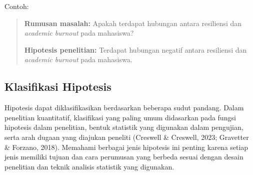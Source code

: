 \documentclass[
  indonesian,
  letterpaper,
  DIV=11,
  numbers=noendperiod]{scrreprt}
\begin{document}
Contoh:

\begin{quote}
\textbf{Rumusan masalah:} Apakah terdapat hubungan antara resiliensi dan
\emph{academic burnout} pada mahasiswa?

\textbf{Hipotesis penelitian:} Terdapat hubungan negatif antara
resiliensi dan \emph{academic burnout} pada mahasiswa.
\end{quote}

\subsection{Klasifikasi Hipotesis}\label{klasifikasi-hipotesis}

Hipotesis dapat diklasifikasikan berdasarkan beberapa sudut pandang.
Dalam penelitian kuantitatif, klasifikasi yang paling umum didasarkan
pada fungsi hipotesis dalam penelitian, bentuk statistik yang digunakan
dalam pengujian, serta arah dugaan yang diajukan peneliti (Creswell \&
Creswell, 2023; Gravetter \& Forzano, 2018). Memahami berbagai jenis
hipotesis ini penting karena setiap jenis memiliki tujuan dan cara
perumusan yang berbeda sesuai dengan desain penelitian dan teknik
analisis statistik yang digunakan.
\end{document}
